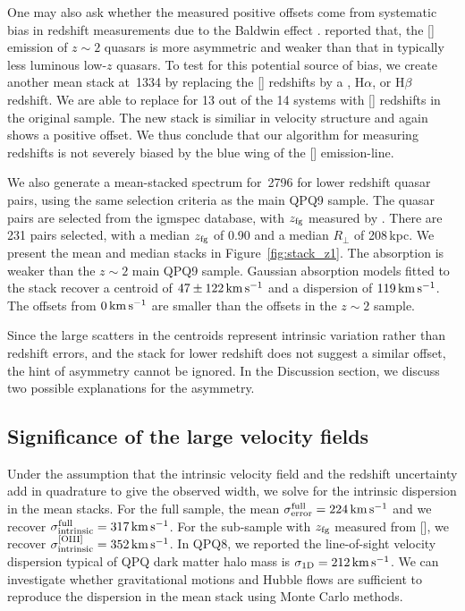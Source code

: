 \documentclass[iop]{emulateapj}
\begin{document}
One may also ask whether the measured positive offsets come from systematic bias in redshift 
measurements due to the Baldwin effect \citep{Baldwin77}. \cite{Shen16} reported that, the 
[] emission of $z\sim2$ quasars is more asymmetric and weaker than that in typically 
less luminous low-$z$ quasars. To test for this potential source of bias, we create another mean 
stack at \,1334 by replacing the [] redshifts by a , H$\alpha$, or 
H$\beta$ redshift. We are able to replace for 13 out of the 14 systems with [] redshifts 
in the original sample. The new stack is similiar in velocity structure and again shows a positive 
offset. We thus conclude that our algorithm for measuring redshifts is not severely biased by 
the blue wing of the [] emission-line. 

We also generate a mean-stacked spectrum for \,2796 for lower redshift quasar pairs, 
using the same selection criteria as the main QPQ9 sample. The quasar pairs are selected from the 
igmspec database, with $z_{\rm fg}$ measured by \cite{HewettWild10}. There are 231 pairs selected, 
with a median $z_{\rm fg}$ of 0.90 and a median $R_\perp$ of 208\,kpc. We present the mean and 
median stacks in Figure~\ref{fig:stack_z1}. The absorption is weaker than the $z\sim2$ main QPQ9 
sample. Gaussian absorption models fitted to the stack recover a centroid of 
$47\pm122\,{\rm km\,s^{-1}}$ and a dispersion of $119\,{\rm km\,s^{-1}}$. The offsets from 
$0\,{\rm km\,s^{-1}}$ are smaller than the offsets in the $z\sim2$ sample. 

Since the large scatters in the centroids represent intrinsic variation rather than redshift 
errors, and the  stack for lower redshift does not suggest a similar offset, the hint 
of asymmetry cannot be ignored. In the Discussion section, we discuss two possible explanations 
for the asymmetry. 


\subsection{Significance of the large velocity fields}
\label{sec:significance_width}

Under the assumption that the intrinsic velocity field and the redshift uncertainty add in 
quadrature to give the observed width, we solve for the intrinsic dispersion in the  
mean stacks. For the full sample, the mean $\sigma_{\rm error}^{\rm full}=224\,{\rm km\,s^{-1}}$ 
and we recover $\sigma_{\rm intrinsic}^{\rm full}=317\,{\rm km\,s^{-1}}$. For the sub-sample with 
$z_{\rm fg}$ measured from [], we recover 
$\sigma_{\rm intrinsic}^{\rm [OIII]}=352\,{\rm km\,s^{-1}}$. In QPQ8, we reported the 
line-of-sight velocity dispersion typical of QPQ dark matter halo mass is 
$\sigma_{\rm 1D}=212\,{\rm km\,s^{-1}}$. We can investigate whether gravitational motions and 
Hubble flows are sufficient to reproduce the dispersion in the  mean stack using Monte 
Carlo methods. 
\end{document}
